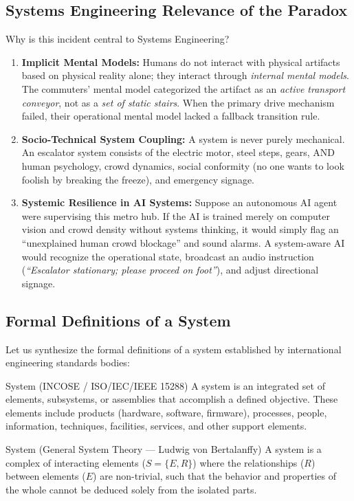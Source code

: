 \subsection{Systems Engineering Relevance of the Paradox}
Why is this incident central to Systems Engineering?
\begin{enumerate}[leftmargin=1.5em]
    \item \textbf{Implicit Mental Models:} Humans do not interact with physical artifacts based on physical reality alone; they interact through \textit{internal mental models}. The commuters' mental model categorized the artifact as an \textit{active transport conveyor}, not as a \textit{set of static stairs}. When the primary drive mechanism failed, their operational mental model lacked a fallback transition rule.
    \item \textbf{Socio-Technical System Coupling:} A system is never purely mechanical. An escalator system consists of the electric motor, steel steps, gears, AND human psychology, crowd dynamics, social conformity (no one wants to look foolish by breaking the freeze), and emergency signage.
    \item \textbf{Systemic Resilience in AI Systems:} Suppose an autonomous AI agent were supervising this metro hub. If the AI is trained merely on computer vision and crowd density without systems thinking, it would simply flag an ``unexplained human crowd blockage'' and sound alarms. A system-aware AI would recognize the operational state, broadcast an audio instruction (\textit{``Escalator stationary; please proceed on foot''}), and adjust directional signage.
\end{enumerate}

\subsection{Formal Definitions of a System}
Let us synthesize the formal definitions of a system established by international engineering standards bodies:

\begin{definitionbox}{System (INCOSE / ISO/IEC/IEEE 15288)}
A system is an integrated set of elements, subsystems, or assemblies that accomplish a defined objective. These elements include products (hardware, software, firmware), processes, people, information, techniques, facilities, services, and other support elements.
\end{definitionbox}

\begin{definitionbox}{System (General System Theory --- Ludwig von Bertalanffy)}
A system is a complex of interacting elements ($S = \{E, R\}$) where the relationships ($R$) between elements ($E$) are non-trivial, such that the behavior and properties of the whole cannot be deduced solely from the isolated parts.
\end{definitionbox}

